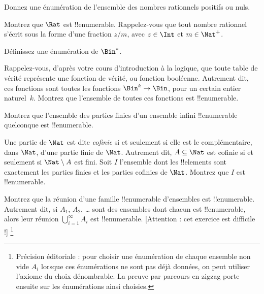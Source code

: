 \documentclass[11pt,a4paper,openany]{memoir}
\begin{document}
\begin{prob}
Donnez une énumération de l’ensemble des nombres rationnels
positifs ou nuls.
\end{prob}

\begin{prob}
Montrez que $\Rat$ est !!{enumerable}. Rappelez-vous que tout
nombre rationnel s’écrit sous la forme d’une fraction $z/m$,
avec $z \in \Int$ et $m \in \Nat^+$.
\end{prob}

\begin{prob}
Définissez une énumération de $\Bin^*$.
\end{prob}

\begin{prob}
Rappelez-vous, d’après votre cours d’introduction à la logique,
que toute table de vérité représente une fonction de vérité,
ou fonction booléenne. Autrement dit, ces fonctions sont toutes
les fonctions $\Bin^k \to \Bin$, pour un certain entier
naturel~$k$. Montrez que l’ensemble de toutes ces fonctions
est !!{enumerable}.
\end{prob}

\begin{prob}
Montrez que l’ensemble des parties finies d’un ensemble infini
!!{enumerable} quelconque est !!{enumerable}.
\end{prob}

\begin{prob}
Une partie de $\Nat$ est dite \emph{cofinie} si et seulement si
elle est le complémentaire, dans $\Nat$, d’une partie finie de $\Nat$.
Autrement dit, $A \subseteq \Nat$ est cofinie si et seulement si
$\Nat\setminus A$ est fini. Soit $I$ l’ensemble dont les
!!{element}s sont exactement les parties finies et les parties
cofinies de $\Nat$. Montrez que $I$ est !!{enumerable}.
\end{prob}

\begin{prob}
Montrez que la réunion d’une famille !!{enumerable} d’ensembles
 est !!{enumerable}. Autrement dit,
si $A_1$, $A_2$, \dots{} sont des ensembles dont chacun est
!!{enumerable}, alors leur réunion $\bigcup_{i=1}^\infty A_i$
est !!{enumerable}. [Attention : cet exercice est difficile !]
\footnote{Précision éditoriale : pour choisir une énumération de
chaque ensemble non vide $A_i$ lorsque ces énumérations ne sont
pas déjà données, on peut utiliser l’axiome du choix dénombrable.
La preuve par parcours en zigzag porte ensuite sur les énumérations
ainsi choisies.}
\end{prob}
\end{document}
